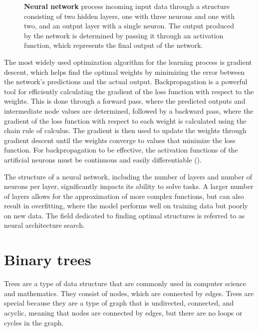 \begin{figure}[!ht]
\centering
{}
\caption[Neural network and its components]{
  \textbf{Neural network} process incoming input data through a structure consisting of two hidden layers, one with three neurons and one with two, and an output layer with a single neuron. The output produced by the network is determined by passing it through an activation function, which represents the final output of the network.
  }
\label{fig:neural_network}
\end{figure}


The most widely used optimization algorithm for the learning process is gradient descent, which helps find the optimal weights by minimizing the error between the network's predictions and the actual output. Backpropagation is a powerful tool for efficiently calculating the gradient of the loss function with respect to the weights. This is done through a forward pass, where the predicted outputs and intermediate node values are determined, followed by a backward pass, where the gradient of the loss function with respect to each weight is calculated using the chain rule of calculus. The gradient is then used to update the weights through gradient descent until the weights converge to values that minimize the loss function. For backpropagation to be effective, the activation functions of the artificial neurons must be continuous and easily differentiable (\cite{goodfellow_deep_2016}).

The structure of a neural network, including the number of layers and number of neurons per layer, significantly impacts its ability to solve tasks. A larger number of layers allows for the approximation of more complex functions, but can also result in overfitting, where the model performs well on training data but poorly on new data. The field dedicated to finding optimal structures is referred to as neural architecture search.

\section{Binary trees}

Trees are a type of data structure that are commonly used in computer science and mathematics. They consist of nodes, which are connected by edges. Trees are special because they are a type of graph that is undirected, connected, and acyclic, meaning that nodes are connected by edges, but there are no loops or cycles in the graph.

